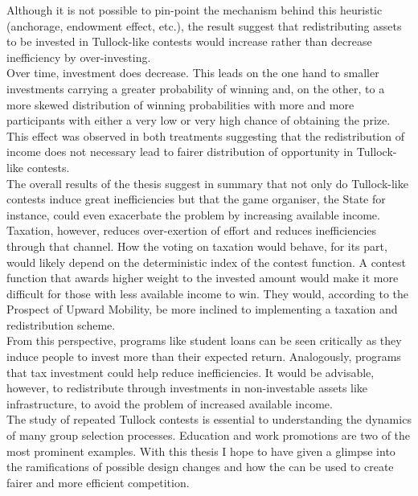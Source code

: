 Although it is not possible to pin-point the mechanism behind this heuristic (anchorage, endowment effect, etc.), the result suggest that redistributing assets to be invested in Tullock-like contests would increase rather than decrease inefficiency by over-investing.\\  

Over time, investment does decrease. This leads on the one hand to smaller investments carrying a greater probability of winning and, on the other, to a more skewed distribution of winning probabilities with more and more participants with either a very low or very high chance of obtaining the prize. This effect was observed in both treatments suggesting that the redistribution of income does not necessary lead to fairer distribution of opportunity in Tullock-like contests.\\

The overall results of the thesis suggest in summary that not only do Tullock-like contests induce great inefficiencies but that the game organiser, the State for instance, could even exacerbate the problem by increasing available income. Taxation, however, reduces over-exertion of effort and reduces inefficiencies through that channel. How the voting on taxation would behave, for its part, would likely depend on the deterministic index of the contest function. A contest function that awards higher weight to the invested amount would make it more difficult for those with less available income to win. They would, according to the Prospect of Upward Mobility, be more inclined to implementing a taxation and redistribution scheme.\\

From this perspective, programs like student loans can be seen critically as they induce people to invest more than their expected return. Analogously, programs that tax investment could help reduce inefficiencies. It would be advisable, however, to redistribute through investments in non-investable assets like infrastructure, to avoid the problem of increased available income.\\

The study of repeated Tullock contests is essential to understanding the dynamics of many group selection processes. Education and work promotions are two of the most prominent examples. With this thesis I hope to have given a glimpse into the ramifications of possible design changes and how the can be used to create fairer and more efficient competition.